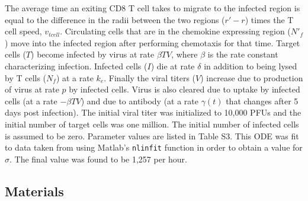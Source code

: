 \documentclass[preprint,10pt,authoryear]{elsarticle}
\begin{document}
The average time an exiting CD8 T cell takes to migrate to the infected region is equal to the difference in the radii between the two regions ($r' - r$) times the T cell speed, $v_{tcell}$.  Circulating cells that are in the chemokine expressing region ($N'_{f}$) move into the infected region after performing chemotaxis for that time. Target cells ($T$) become infected by virus at rate $\beta TV$, where $\beta$ is the rate constant characterizing infection. Infected cells ($I$) die at rate $\delta$ in addition to being lysed by T cells ($N_{f}$) at a rate $k_{e}$. Finally the viral titers ($V$) increase due to production of virus at rate $p$ by infected cells. Virus is also cleared due to uptake by infected cells (at a rate $- \beta TV$) and due to antibody (at a rate $\gamma (t)$ that changes after 5 days post infection). The initial viral titer was initialized to 10,000 PFUs and the initial number of target cells was one million. The initial number of infected cells is assumed to be zero. Parameter values are listed in Table S3.  This ODE was fit to data taken from \citep{Miao2010a} using Matlab's \texttt{nlinfit} function in order to obtain a value for $\sigma$.  The final value was found to be 1,257 per hour.


\subsection*{Materials}
\end{document}
